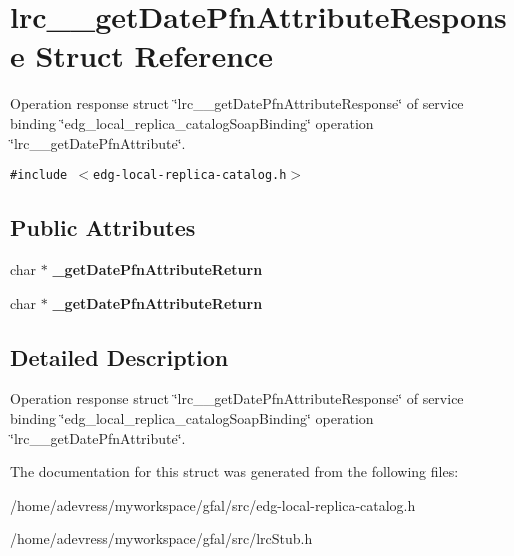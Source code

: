 \section{lrc\_\-\_\-get\-Date\-Pfn\-Attribute\-Response Struct Reference}
\label{structlrc____getDatePfnAttributeResponse}
Operation response struct \char`\"{}lrc\_\-\_\-get\-Date\-Pfn\-Attribute\-Response\char`\"{} of service binding \char`\"{}edg\_\-local\_\-replica\_\-catalog\-Soap\-Binding\char`\"{} operation \char`\"{}lrc\_\-\_\-get\-Date\-Pfn\-Attribute\char`\"{}.  


{\tt \#include $<$edg-local-replica-catalog.h$>$}

\subsection*{Public Attributes}
\begin{CompactItemize}
\item 
char $\ast$ \textbf{\_\-get\-Date\-Pfn\-Attribute\-Return}\label{structlrc____getDatePfnAttributeResponse_cfdd4fd6471f2be65970d0414242cf65}

\item 
char $\ast$ \textbf{\_\-get\-Date\-Pfn\-Attribute\-Return}\label{structlrc____getDatePfnAttributeResponse_cfdd4fd6471f2be65970d0414242cf65}

\end{CompactItemize}


\subsection{Detailed Description}
Operation response struct \char`\"{}lrc\_\-\_\-get\-Date\-Pfn\-Attribute\-Response\char`\"{} of service binding \char`\"{}edg\_\-local\_\-replica\_\-catalog\-Soap\-Binding\char`\"{} operation \char`\"{}lrc\_\-\_\-get\-Date\-Pfn\-Attribute\char`\"{}. 



The documentation for this struct was generated from the following files:\begin{CompactItemize}
\item 
/home/adevress/myworkspace/gfal/src/edg-local-replica-catalog.h\item 
/home/adevress/myworkspace/gfal/src/lrc\-Stub.h\end{CompactItemize}
